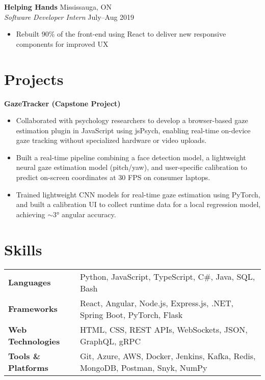 \documentclass[a4paper,10pt]{article}
\begin{document}
\textbf{Helping Hands} \hfill Mississauga, ON \\
\textit{Software Developer Intern} \hfill July–Aug 2019
\begin{itemize}
    \item Rebuilt 90\% of the front-end using React to deliver new responsive components for improved UX
\end{itemize}

\section*{Projects}

\textbf{GazeTracker (Capstone Project)}
\begin{itemize}[itemsep=2pt]
    \item Collaborated with psychology researchers to develop a browser-based gaze estimation plugin in JavaScript using jsPsych, enabling real-time on-device gaze tracking without specialized hardware or video uploads.
    \item Built a real-time pipeline combining a face detection model, a lightweight neural gaze estimation model (pitch/yaw), and user-specific calibration to predict on-screen coordinates at 30 FPS on consumer laptops.
    \item Trained lightweight CNN models for real-time gaze estimation using PyTorch, and built a calibration UI to collect runtime data for a local regression model, achieving $\sim$3° angular accuracy.
\end{itemize}

\section*{Skills}

\begin{tabular}{ l l }
\textbf{Languages} & Python, JavaScript, TypeScript, C\#, Java, SQL, Bash \\
\textbf{Frameworks} & React, Angular, Node.js, Express.js, .NET, Spring Boot, PyTorch, Flask \\
\textbf{Web Technologies} & HTML, CSS, REST APIs, WebSockets, JSON, GraphQL, gRPC \\
\textbf{Tools \& Platforms} & Git, Azure, AWS, Docker, Jenkins, Kafka, Redis, MongoDB, Postman, Snyk, NumPy \\
\end{tabular}
\end{document}
